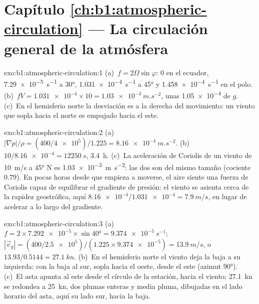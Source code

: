 \section*{Capítulo \ref{ch:b1:atmospheric-circulation} --- La circulación general de la atmósfera}

\begin{solution}{exo:b1:atmospheric-circulation:1}
(a)~$f = 2\Omega\sin\varphi$: $0$ en el ecuador, \qty{7.29e-5}{s^{-1}} a \ang{30},
\qty{1.031e-4}{s^{-1}} a \ang{45} y \qty{1.458e-4}{s^{-1}} en el polo.
(b)~$fV = \num{1.031e-4} \times 10 = \qty{1.03e-3}{m.s^{-2}}$, unas \num{1.05e-4}
de $g$. (c)~En el hemisferio norte la desviación es a la derecha del movimiento: un viento que sopla hacia el norte es empujado hacia el este.
\end{solution}

\begin{solution}{exo:b1:atmospheric-circulation:2}
(a)~$|\nabla p|/\rho = (400/\num{4e5})/1.225 = \qty{8.16e-4}{m.s^{-2}}$.
(b)~$10/\num{8.16e-4} = \qty{12250}{s}$, \qty{3.4}{h}. (c)~La aceleración de Coriolis de un viento de \qty{10}{m/s} a \ang{45} N es \qty{1.03e-3}{m.s^{-2}}: las dos son del mismo tamaño (cociente $0.79$). En pocas horas desde que empieza a moverse, el aire siente una fuerza de Coriolis capaz de equilibrar el gradiente de presión: el viento se asienta cerca de la rapidez geostrófica, aquí $\num{8.16e-4}/\num{1.031e-4} = \qty{7.9}{m/s}$, en lugar de acelerar a lo largo del gradiente.
\end{solution}

\begin{solution}{exo:b1:atmospheric-circulation:3}
(a)~$f = 2 \times \num{7.292e-5} \times \sin\ang{40} = \qty{9.374e-5}{s^{-1}}$;
$|\vec v_g| = (400/\num{2.5e5})/(1.225 \times \num{9.374e-5}) = \qty{13.9}{m/s}$, o
$13.93/0.5144 = \qty{27.1}{kn}$. (b)~En el hemisferio norte el viento deja la baja a su izquierda: con la baja al sur, sopla hacia el oeste, desde el este (azimut \ang{90}). (c)~El asta apunta al este desde el círculo de la estación, hacia el viento; \qty{27.1}{kn} se redondea a \qty{25}{kn}, dos plumas enteras y media pluma, dibujadas en el lado horario del asta, aquí su lado sur, hacia la baja.
\end{solution}

